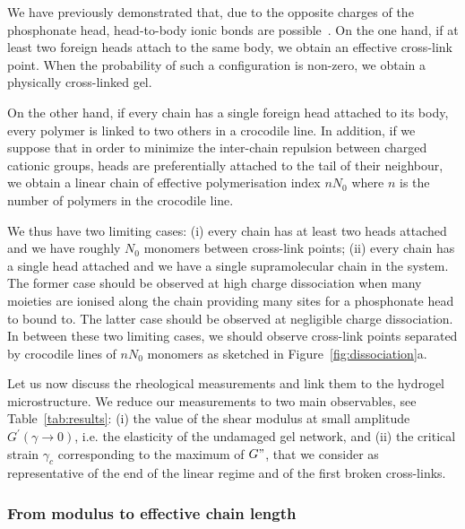 \documentclass[journal=jacsat,manuscript=article]{achemso}
\begin{document}
We have previously demonstrated that, due to the opposite charges of the phosphonate head, head-to-body ionic bonds are possible~\cite{Srour2014}. On the one hand, if at least two foreign heads attach to the same body, we obtain an effective cross-link point. When the probability of such a configuration is non-zero, we obtain a physically cross-linked gel.

On the other hand, if every chain has a single foreign head attached to its body, every polymer is linked to two others in a crocodile line. In addition, if we suppose that in order to minimize the inter-chain repulsion between charged cationic groups, heads are preferentially attached to the tail of their neighbour, we obtain a linear chain of effective polymerisation index $n N_0$ where $n$ is the number of polymers in the crocodile line.

We thus have two limiting cases: (i) every chain has at least two heads attached and we have roughly $N_0$ monomers between cross-link points; (ii) every chain has a single head attached and we have a single supramolecular chain in the system. The former case should be observed at high charge dissociation when many moieties are ionised along the chain providing many sites for a phosphonate head to bound to. The latter case should be observed at negligible charge dissociation. In between these two limiting cases, we should observe cross-link points separated by crocodile lines of $n N_0$ monomers as sketched in Figure~\ref{fig:dissociation}a.

Let us now discuss the rheological measurements and link them to the hydrogel microstructure. We reduce our measurements to two main observables, see Table~\ref{tab:results}: (i) the value of the shear modulus at small amplitude $G^\prime(\gamma\rightarrow 0)$, i.e. the elasticity of the undamaged gel network, and (ii) the critical strain $\gamma_c$ corresponding to the maximum of $G"$, that we consider as representative of the end of the linear regime and of the first broken cross-links\cite{Hyun2011}.


\subsubsection{From modulus to effective chain length}
\end{document}
